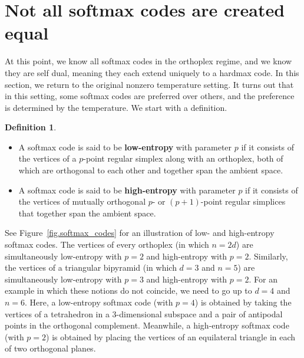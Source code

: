 \documentclass{article}
\theoremstyle{plain}
\theoremstyle{definition}
\newtheorem{definition}[theorem]{Definition}
\begin{document}
\section{Not all softmax codes are created equal}
\label{sec.nonequal}

At this point, we know all softmax codes in the orthoplex regime, and we know they are self dual, meaning they each extend uniquely to a hardmax code.
In this section, we return to the original nonzero temperature setting.
It turns out that in this setting, some softmax codes are preferred over others, and the preference is determined by the temperature.
We start with a definition.

\begin{definition}\
\begin{itemize}
\item[(a)]
A softmax code is said to be \textbf{low-entropy} with parameter $p$ if it consists of the vertices of a $p$-point regular simplex along with an orthoplex, both of which are orthogonal to each other and together span the ambient space.
\item[(b)]
A softmax code is said to be  \textbf{high-entropy} with parameter $p$ if it consists of the vertices of mutually orthogonal $p$- or $(p+1)$-point regular simplices that together span the ambient space.
\end{itemize}
\end{definition}

See Figure~\ref{fig.softmax_codes} for an illustration of low- and high-entropy softmax codes.
The vertices of every orthoplex (in which $n=2d$) are simultaneously low-entropy with $p=2$ and high-entropy with $p=2$.
Similarly, the vertices of a triangular bipyramid (in which $d=3$ and $n=5$) are simultaneously low-entropy with $p=3$ and high-entropy with $p=2$.
For an example in which these notions do not coincide, we need to go up to $d=4$ and $n=6$.
Here, a low-entropy softmax code (with $p=4$) is obtained by taking the vertices of a tetrahedron in a $3$-dimensional subspace and a pair of antipodal points in the orthogonal complement.
Meanwhile, a high-entropy softmax code (with $p=2$) is obtained by placing the vertices of an equilateral triangle in each of two orthogonal planes.
\end{document}
